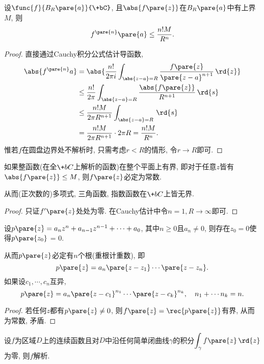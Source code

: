 \documentclass[../ComplexVariable.tex]{subfiles}
\begin{document}
\begin{ex}[Cauchy估计]
    设$\func{f}{B_R\pare{a}}{\+bC}$, 且$\abs{f\pare{z}}$在$B_R\pare{a}$中有上界$M$, 则
    \[ f^{\pare{n}}\pare{a} \le \frac{n!M}{R^n}. \]
\end{ex}
\begin{proof}
    直接通过Cauchy积分公式估计导函数,
    \begin{align*}
        \abs{f^{\pare{n}}a} &= \abs{\frac{n!}{2\pi i} \int_{\abs{z-a}=R} \frac{f\pare{z}}{\pare{z-a}^{n+1}}\,\rd{z}} \\
        &\le \frac{n!}{2\pi} \int_{\abs{z-a}=R} \frac{\abs{f\pare{z}}}{R^{n+1}}\,\rd{s} \\
        &\le \frac{n!M}{2\pi R^{n+1}} \int_{\abs{z-a}=R}\,\rd{s}\\
        &= \frac{n!M}{2\pi R^{n+1}}\cdot 2\pi R = \frac{n!M}{R^n}.
    \end{align*}
    惟若$f$在圆盘边界处不解析时, 只需考虑$r<R$的情形, 令$r\rightarrow R$即可.
\end{proof}
\begin{theorem}[Liouville定理]
    如果整函数(在全$\+bC$上解析的函数)在整个平面上有界, 即对于任意$z$皆有$\abs{f\pare{z}}\le M$, 则$f\pare{z}$必定为常数.
\end{theorem}
\begin{remark}
    从而(正次数的)多项式, 三角函数, 指数函数在$\+bC$上皆无界.
\end{remark}
\begin{proof}
    只证$f'\pare{z}$处处为零. 在Cauchy估计中令$n=1, R\rightarrow\infty$即可.
\end{proof}
\begin{theorem}[代数基本定理]
    设$p\pare{z} = a_nz^n + a_{n-1}z^{n-1} + \cdots + a_0$, 其中$n\ge 0$且$a_n\neq 0$, 则存在$z_0 = 0$使得$p\pare{z_0}$ = 0.
\end{theorem}
\begin{remark}
    从而$p\pare{z}$必定有$n$个根(重根计重数), 即
    \[ p\pare{z} = a_n \pare{z-z_1}\cdots \pare{z-z_n}. \]
    如果设$c_1,\cdots,c_n$互异,
    \[ p\pare{z} = a_n\pare{z-c_1}^{n_1}\cdots\pare{z-c_k}^{n_k},\quad n_1 + \cdots n_k = n. \]
\end{remark}
\begin{proof}
    若任何$z$都有$p\pare{z}\neq 0$, 则$f\pare{z} = \displaystyle \rec{p\pare{z}}$有界, 从而为常数, 矛盾.
\end{proof}
\begin{theorem}[Morera定理]
    设$f$为区域$D$上的连续函数且对$D$中沿任何简单闭曲线$\gamma$的积分$\displaystyle \int_\gamma f\pare{z}\,\rd{z}$为零, 则$f$解析.
\end{theorem}
\end{document}
